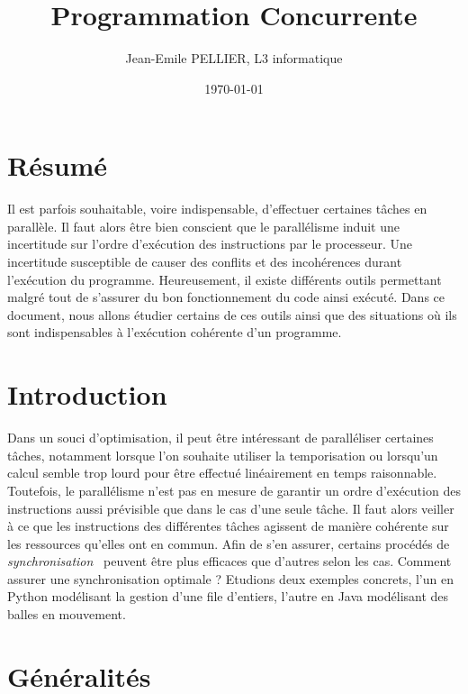 \documentclass{article}
\title{Programmation Concurrente}
\author{Jean-Emile PELLIER, L3 informatique}
\date{\today}
\begin{document}
\maketitle %

\section*{Résumé}

Il est parfois souhaitable, voire indispensable, d’effectuer certaines tâches en parallèle. Il faut alors être bien conscient que le parallélisme induit une incertitude sur l’ordre d’exécution des instructions par le processeur. Une incertitude susceptible de causer des conflits et des incohérences durant l’exécution du programme. Heureusement, il existe différents outils permettant malgré tout de s’assurer du bon fonctionnement du code ainsi exécuté.
\medbreak
Dans ce document, nous allons étudier certains de ces outils ainsi que des situations où ils sont indispensables à l’exécution cohérente d’un programme.

\section*{Introduction}

Dans un souci d’optimisation, il peut être intéressant de paralléliser certaines tâches, notamment lorsque l’on souhaite utiliser la temporisation ou lorsqu’un calcul semble trop lourd pour être effectué linéairement en temps raisonnable. Toutefois, le parallélisme n’est pas en mesure de garantir un ordre d’exécution des instructions aussi prévisible que dans le cas d’une seule tâche. Il faut alors veiller à ce que les instructions des différentes tâches agissent de manière cohérente sur les ressources qu’elles ont en commun. Afin de s’en assurer, certains procédés de \textit{synchronisation}~\cite{refSynchronisation} peuvent être plus efficaces que d’autres selon les cas.
\medbreak
Comment assurer une synchronisation optimale ?
\medbreak
Etudions deux exemples concrets, l’un en Python modélisant la gestion d’une file d’entiers, l’autre en Java modélisant des balles en mouvement.

\section*{Généralités}
\end{document}
